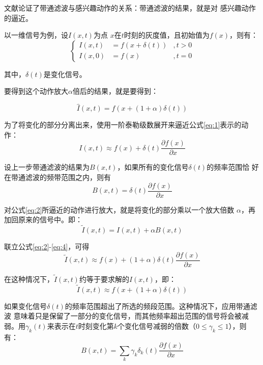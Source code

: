 文献\cite{wu2012eulerian}论证了带通滤波与感兴趣动作的关系：带通滤波的结果，就是对
感兴趣动作的逼近。

  以一维信号为例，设$I(x,t)$为点
$x$在$t$时刻的灰度值，且初始值为$f(x)$，则有：
\begin{equation}
  \label{eq:1}
  \left\{ \begin{aligned} I(x,t) & = f(x+\delta(t)) & , t >0 \\ I(x,0) & = f(x) &
        , t=0 \end{aligned} \right.
\end{equation}

其中，$\delta(t)$是变化信号。

要得到这个动作放大$\alpha$倍后的结果，就是要得到：

\begin{equation}
  \label{eq:2}
  \hat{I}(x,t)=f(x+(1+\alpha)\delta (t))
\end{equation}

为了将变化的部分分离出来，使用一阶泰勒级数展开来逼近公式\ref{eq:1}表示的动作：
\begin{equation}
  \label{eq:3}
  I(x,t)\approx f(x)+\delta(t)\frac{\partial f(x)}{\partial x}
\end{equation}

设上一步带通滤波的结果为$B(x,t)$，如果所有的变化信号$\delta(t)$的频率范围恰
好在带通滤波的频带范围之内，则有
\begin{equation}
  \label{eq:4}
  B(x,t)=\delta(t)\frac{\partial f(x)}{\partial x}
\end{equation}

对公式\ref{eq:2}所逼近的动作进行放大，就是将变化的部分乘以一个放大倍数
$\alpha$，再加回原来的信号中。即：
\begin{equation}
  \label{eq:5}
  \tilde{I}(x,t)=I(x,t)+\alpha B(x,t)
\end{equation}

联立公式\ref{eq:2}-\ref{eq:4}，可得
\begin{equation}
  \label{eq:6}
  \tilde{I}(x,t)\approx f(x)+(1+\alpha)\delta(t)\frac{\partial f(x)}{\partial x}
\end{equation}

在这种情况下，$\tilde{I}(x,t)$约等于要求解的$I(x,t)$，即：
\begin{equation}
  \label{eq:7}
  \tilde{I}(x,t)\approx f(x+(1+\alpha)\delta(t))
\end{equation}

如果变化信号$\delta(t)$的频率范围超出了所选的频段范围。这种情况下，应用带通滤波
意味着只是保留了一部分的变化信号，而其他频率超出范围的信号将会被减弱。用$\gamma_k(t)$来表示在$t$时刻变化第$k$个变化信号减弱的倍数（$0\le \gamma_k \le
1$），则有：
\begin{equation}
    \label{eq:8}
    B(x,t) = \sum_k \gamma_{k}\delta_{k}(t)\frac{\partial f(x)}{\partial x}
\end{equation}

